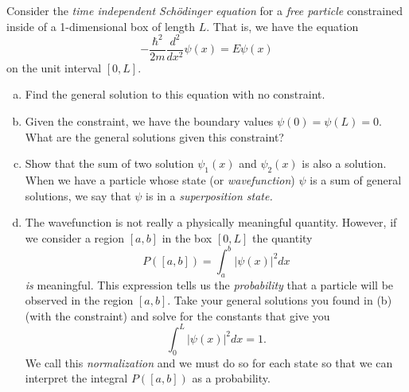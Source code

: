 \documentclass[12pt]{article} %
\begin{document}
\newpage

\begin{problem}
Consider the \emph{time independent Sch\"odinger equation} for a \emph{free particle} constrained inside of a 1-dimensional box of length $L$. That is, we have the equation
\[
-\frac{\hbar^2}{2m}\frac{d^2}{dx^2}\psi(x)=E\psi(x)
\]
on the unit interval $[0,L]$.
\begin{enumerate}[(a)]
    \item Find the general solution to this equation with no constraint.
    \item Given the constraint, we have the boundary values $\psi(0)=\psi(L)=0$. What are the general solutions given this constraint?
    \item Show that the sum of two solution $\psi_1(x)$ and $\psi_2(x)$ is also a solution. When we have a particle whose state (or \emph{wavefunction}) $\psi$ is a sum of general solutions, we say that $\psi$ is in a \emph{superposition state.}
    \item The wavefunction is not really a physically meaningful quantity.  However, if we consider a region $[a,b]$ in the box $[0,L]$ the quantity
    \[
    P([a,b])=\int_a^b |\psi(x)|^2dx
    \]
    \emph{is} meaningful. This expression tells us the \emph{probability} that a particle will be observed in the region $[a,b]$.  Take your general solutions you found in (b) (with the constraint) and solve for the constants that give you
    \[
    \int_0^L |\psi(x)|^2dx=1.
    \]
    We call this \emph{normalization} and we must do so for each state so that we can interpret the integral $P([a,b])$ as a probability.
\end{enumerate}
\end{problem}
\end{document}
